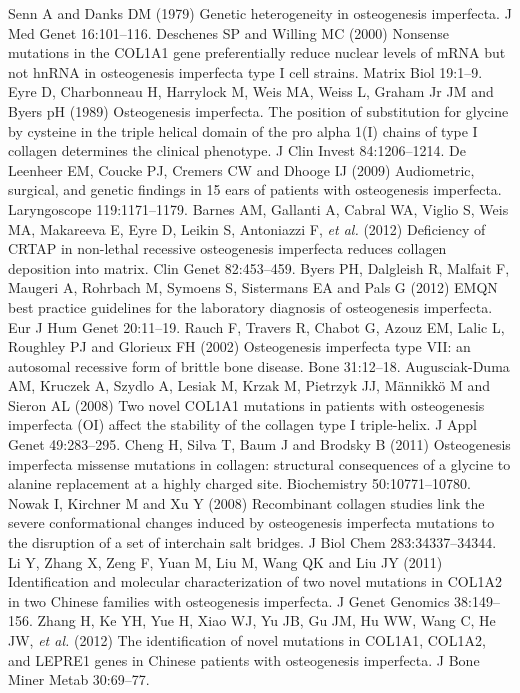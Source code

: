 \begin{biblio}[References]
 Senn A and Danks DM (1979) Genetic heterogeneity in osteogenesis imperfecta. J Med Genet 16:101–116.
 Deschenes SP and Willing MC (2000) Nonsense mutations in the COL1A1 gene preferentially reduce nuclear levels of mRNA but not hnRNA in osteogenesis imperfecta type I cell strains. Matrix Biol 19:1–9.
 Eyre D, Charbonneau H, Harrylock M, Weis MA, Weiss L, Graham Jr JM and Byers pH (1989) Osteogenesis imperfecta. The position of substitution for glycine by cysteine in the triple helical domain of the pro alpha 1(I) chains of type I collagen determines the clinical phenotype. J Clin Invest 84:1206–1214.
 De Leenheer EM, Coucke PJ, Cremers CW and Dhooge IJ (2009) Audiometric, surgical, and genetic findings in 15 ears of patients with osteogenesis imperfecta. Laryngoscope 119:1171–1179.
 Barnes AM, Gallanti A, Cabral WA, Viglio S, Weis MA, Makareeva E, Eyre D, Leikin S, Antoniazzi F, \textit{et al.} (2012) Deficiency of CRTAP in non-lethal recessive osteogenesis imperfecta reduces collagen deposition into matrix. Clin Genet 82:453–459.
 Byers PH, Dalgleish R, Malfait F, Maugeri A, Rohrbach M, Symoens S, Sistermans EA and Pals G (2012) EMQN best practice guidelines for the laboratory diagnosis of osteogenesis imperfecta. Eur J Hum Genet 20:11–19.
 Rauch F, Travers R, Chabot G, Azouz EM, Lalic L, Roughley PJ and Glorieux FH (2002) Osteogenesis imperfecta type VII: an autosomal recessive form of brittle bone disease. Bone 31:12–18.
 Augusciak-Duma AM, Kruczek A, Szydlo A, Lesiak M, Krzak M, Pietrzyk JJ, Männikkö M and Sieron AL (2008) Two novel COL1A1 mutations in patients with osteogenesis imperfecta (OI) affect the stability of the collagen type I triple-helix. J Appl Genet 49:283–295.
 Cheng H, Silva T, Baum J and Brodsky B (2011) Osteogenesis imperfecta missense mutations in collagen: structural consequences of a glycine to alanine replacement at a highly charged site. Biochemistry 50:10771–10780.
 Nowak I, Kirchner M and Xu Y (2008) Recombinant collagen studies link the severe conformational changes induced by osteogenesis imperfecta mutations to the disruption of a set of interchain salt bridges. J Biol Chem 283:34337–34344.
 Li Y, Zhang X, Zeng F, Yuan M, Liu M, Wang QK and Liu JY (2011) Identification and molecular characterization of two novel mutations in COL1A2 in two Chinese families with osteogenesis imperfecta. J Genet Genomics 38:149–156.
 Zhang H, Ke YH, Yue H, Xiao WJ, Yu JB, Gu JM, Hu WW, Wang C, He JW, \textit{et al.} (2012) The identification of novel mutations in COL1A1, COL1A2, and LEPRE1 genes in Chinese patients with osteogenesis imperfecta. J Bone Miner Metab 30:69–77.
\end{biblio}
